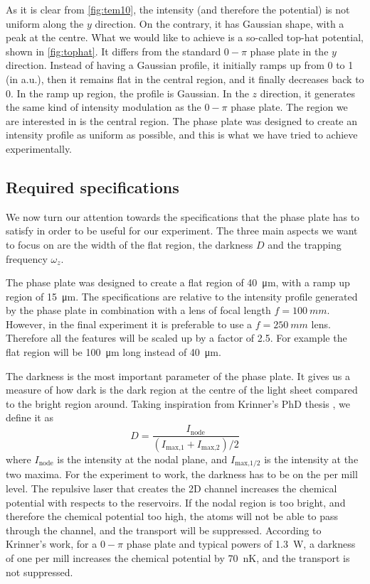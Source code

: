 As it is clear from \cref{fig:tem10}, the intensity (and therefore the potential) is not uniform along the $y$ direction. On the contrary, it has Gaussian shape, with a peak at the centre.
What we would like to achieve is a so-called top-hat potential, shown in \cref{fig:tophat}. It differs from the standard $0-\pi$ phase plate in the $y$ direction. Instead of having a Gaussian profile, it initially ramps up from 0 to 1 (in a.u.), then it remains flat in the central region, and it finally decreases back to 0. In the ramp up region, the profile is Gaussian. In the $z$ direction, it generates the same kind of intensity modulation as the $0-\pi$ phase plate. The region we are interested in is the central region. The phase plate was designed to create an intensity profile as uniform as possible, and this is what we have tried to achieve experimentally.

\subsection{Required specifications}
We now turn our attention towards the specifications that the phase plate has to satisfy in order to be useful for our experiment. The three main aspects we want to focus on are the width of the flat region, the darkness $D$ and the trapping frequency $\omega_z$.

The phase plate was designed to create a flat region of \SI{40}{\micro \meter}, with a ramp up region of \SI{15}{\micro\meter}. The specifications are relative to the intensity profile generated by the phase plate in combination with a lens of focal length $f=\SI{100}{mm}$. However, in the final experiment it is preferable to use a $f=\SI{250}{mm}$ lens. Therefore all the features will be scaled up by a factor of 2.5. For example the flat region will be \SI{100}{\micro\meter} long instead of \SI{40}{\micro\meter}.

The darkness is the most important parameter of the phase plate. It gives us a measure of how dark is the dark region at the centre of the light sheet compared to the bright region around. Taking inspiration from Krinner's PhD thesis \cite{krinner2015b}, we define it as
\begin{equation}
    D = \frac{I_\text{node}}{(I_\text{max,1} + I_\text{max,2}) / 2}
\end{equation}
where $I_\text{node}$ is the intensity at the nodal plane, and $I_\text{max,1/2}$ is the intensity at the two maxima. For the experiment to work, the darkness has to be on the per mill level. The repulsive laser that creates the 2D channel increases the chemical potential with respects to the reservoirs. If the nodal region is too bright, and therefore the chemical potential too high, the atoms will not be able to pass through the channel, and the transport will be suppressed. According to Krinner's work, for a $0-\pi$ phase plate and typical powers of \SI{1.3}{W}, a darkness of one per mill increases the chemical potential by \SI{70}{nK}, and the transport is not suppressed.

